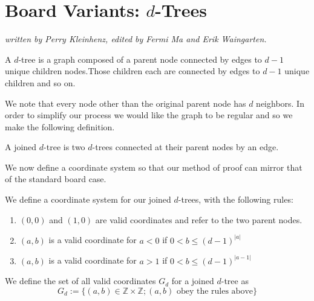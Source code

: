 \documentclass[runningheads,a4paper]{llncs}
\begin{document}
\section{Board Variants: $d$-Trees}
\label{Board Variants: d-Trees}
\emph{written by Perry Kleinhenz, edited by Fermi Ma and Erik Waingarten.}\\


\begin{definition}
A $d$-tree is a graph composed of a parent node connected by edges to $d-1$ unique children nodes.Those children each are connected by edges to $d-1$ unique children and so on.  
\end{definition}
We note that every node other than the original parent node has $d$ neighbors. In order to simplify our process we would like the graph to be regular and so we make the following definition. 
\begin{definition}
A joined $d$-tree is two $d$-trees connected at their parent nodes by an edge.
\end{definition}

We now define a coordinate system so that our method of proof can mirror that of the standard board case.
\begin{definition} We define a coordinate system for our joined $d$-trees, with the following rules:
\begin{enumerate}
	\item $(0,0)$ and $(1,0)$ are valid coordinates and refer to the two parent nodes.
	\item $(a,b)$ is a valid coordinate for $a<0$ if $0<b \leq (d-1)^{|a|}$
	\item $(a,b)$ is a valid coordinate for $a>1$ if $0<b \leq (d-1)^{|a-1|}$
\end{enumerate}
We define the set of all valid coordinates $G_d$ for a joined $d$-tree as 
\begin{equation*}
G_d:= \{ (a,b) \in \mathbb{Z} \times \mathbb{Z} ; (a,b) \text{ obey the rules above}\}
\end{equation*}
\end{definition}
\end{document}
